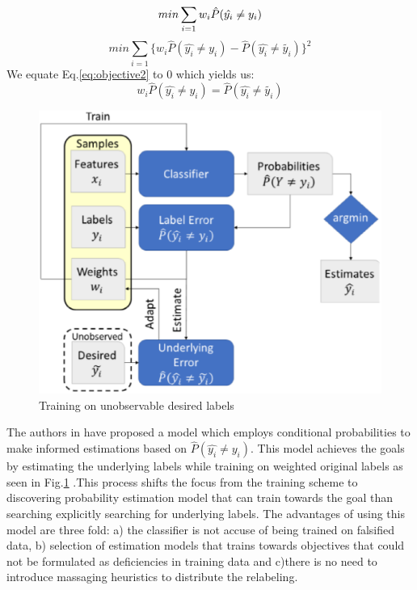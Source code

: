 \documentclass[runningheads]{llncs}
\begin{document}
\begin{equation}
min\sum_{i=1}{w_i\hat{P}(\hat{y_i} \ne y_i)} \\
\label{eq:objective1}
\end{equation}
\begin{equation}
min\sum_{i=1}{\{w_i\hat{P}(\hat{y_i} \ne y_i) - \hat{P}(\hat{y_i} \ne \tilde{y_i})}\}^2 
\label{eq:objective2}
\end{equation}
We equate Eq.\ref{eq:objective2} to 0 which yields us:
\begin{equation}
w_i\hat{P}(\hat{y_i} \ne y_i) = \hat{P}(\hat{y_i} \ne \tilde{y_i})
\label{eq:objective3}
\end{equation}
\begin{figure}[H]
  \centering
  \includegraphics[width=0.5\linewidth]{img/Fig3.eps}
  \caption{Training on unobservable desired labels}
  \label{fig:unobservelabels}
\end{figure}
The authors in \cite{krasanakis2018adaptive} have proposed a model which employs conditional probabilities to make informed estimations based on $\hat{P}(\hat{y_i} \ne y_i)$. This model achieves the goals by estimating the underlying labels while training on weighted original labels as seen in Fig.\ref{fig:unobservelabels} .This process shifts the focus from the training scheme to discovering probability estimation model that can train towards the goal than searching explicitly searching for underlying labels. The advantages of using this model are three fold: a) the classifier is not accuse of being trained on falsified data, b) selection of estimation models that trains towards objectives that could not be formulated as deficiencies in training data and c)there is no need to introduce massaging heuristics to distribute the relabeling.\\
\end{document}
